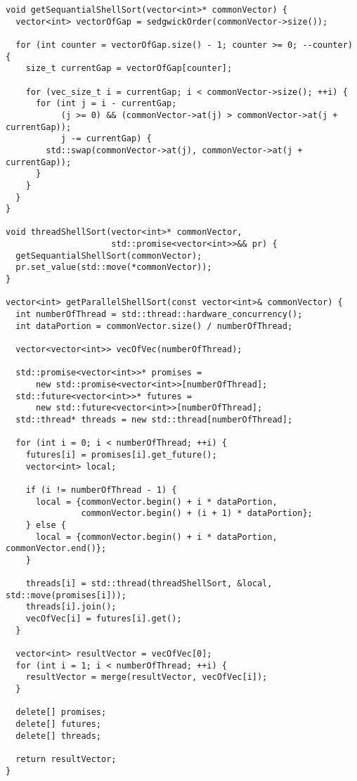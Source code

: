 \documentclass{report}
\begin{document}
\begin{lstlisting}
void getSequantialShellSort(vector<int>* commonVector) {
  vector<int> vectorOfGap = sedgwickOrder(commonVector->size());

  for (int counter = vectorOfGap.size() - 1; counter >= 0; --counter) {
    size_t currentGap = vectorOfGap[counter];

    for (vec_size_t i = currentGap; i < commonVector->size(); ++i) {
      for (int j = i - currentGap;
           (j >= 0) && (commonVector->at(j) > commonVector->at(j + currentGap));
           j -= currentGap) {
        std::swap(commonVector->at(j), commonVector->at(j + currentGap));
      }
    }
  }
}

void threadShellSort(vector<int>* commonVector,
                     std::promise<vector<int>>&& pr) {
  getSequantialShellSort(commonVector);
  pr.set_value(std::move(*commonVector));
}

vector<int> getParallelShellSort(const vector<int>& commonVector) {
  int numberOfThread = std::thread::hardware_concurrency();
  int dataPortion = commonVector.size() / numberOfThread;

  vector<vector<int>> vecOfVec(numberOfThread);

  std::promise<vector<int>>* promises =
      new std::promise<vector<int>>[numberOfThread];
  std::future<vector<int>>* futures =
      new std::future<vector<int>>[numberOfThread];
  std::thread* threads = new std::thread[numberOfThread];

  for (int i = 0; i < numberOfThread; ++i) {
    futures[i] = promises[i].get_future();
    vector<int> local;

    if (i != numberOfThread - 1) {
      local = {commonVector.begin() + i * dataPortion,
               commonVector.begin() + (i + 1) * dataPortion};
    } else {
      local = {commonVector.begin() + i * dataPortion, commonVector.end()};
    }

    threads[i] = std::thread(threadShellSort, &local, std::move(promises[i]));
    threads[i].join();
    vecOfVec[i] = futures[i].get();
  }

  vector<int> resultVector = vecOfVec[0];
  for (int i = 1; i < numberOfThread; ++i) {
    resultVector = merge(resultVector, vecOfVec[i]);
  }

  delete[] promises;
  delete[] futures;
  delete[] threads;

  return resultVector;
}
\end{lstlisting}
\end{document}
